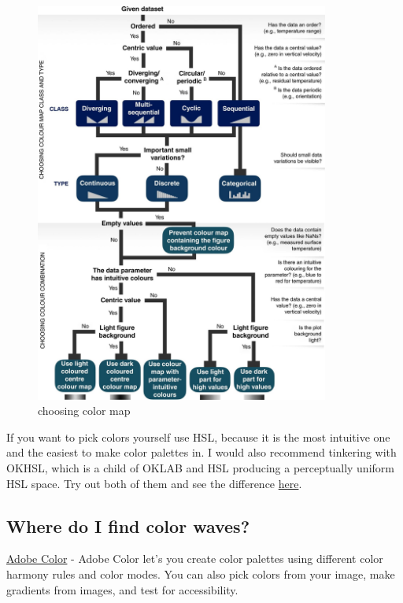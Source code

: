 \documentclass[
  letterpaper,
]{book}
\begin{document}
\begin{figure}

{\centering \includegraphics[width=3.80208in,height=\textheight]{./images/choosing_color_map.jpg}

}

\caption{choosing color map}

\end{figure}

If you want to pick colors yourself use HSL, because it is the most
intuitive one and the easiest to make color palettes in. I would also
recommend tinkering with OKHSL, which is a child of OKLAB and HSL
producing a perceptually uniform HSL space. Try out both of them and see
the difference
\href{https://bottosson.github.io/misc/colorpicker/}{here}.

\hypertarget{where-do-i-find-color-waves}{%
\subsection{Where do I find color
waves?}\label{where-do-i-find-color-waves}}

\href{https://color.adobe.com/create/color-wheel}{Adobe Color} - Adobe
Color let's you create color palettes using different color harmony
rules and color modes. You can also pick colors from your image, make
gradients from images, and test for accessibility.
\end{document}
